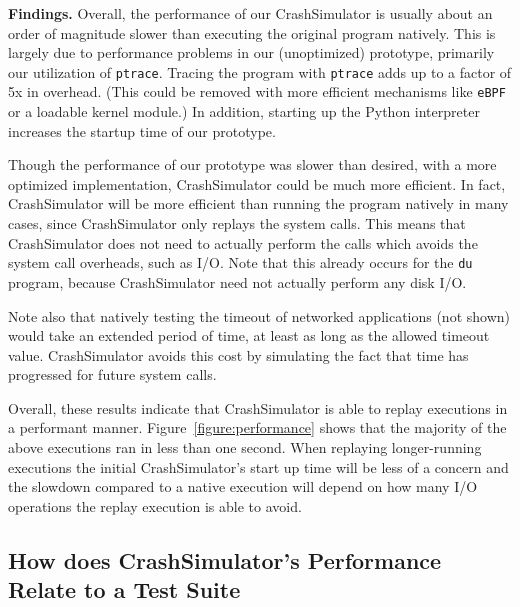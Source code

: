 {\bf Findings.}
Overall, the performance of our CrashSimulator is usually about an order of
magnitude slower than executing the original program natively.  This is 
largely due to performance problems in our (unoptimized) prototype, 
primarily our utilization of {\tt ptrace}.  Tracing the program
with {\tt ptrace} adds up to a factor of 5x in overhead.  (This could
be removed with more efficient mechanisms like {\tt eBPF} or a loadable 
kernel module.)  In addition, starting up the Python interpreter increases the
startup time of our prototype.

Though the performance of our prototype was slower than desired,
with a more optimized implementation, CrashSimulator could be much more 
efficient.
In fact, CrashSimulator will be more efficient than 
running the program natively in many cases, since CrashSimulator only
replays the system calls. This means that CrashSimulator does not need to
actually perform the calls which avoids the system call overheads, such as 
I/O.  Note that this already occurs for the {\tt du} program, because 
CrashSimulator need not actually perform any disk I/O.

Note also that natively testing the timeout of networked applications (not
shown) would take an extended period of time, at least as long as the allowed
timeout value.  CrashSimulator avoids this cost by simulating the fact that
time has progressed for future system calls.

Overall, these results indicate that CrashSimulator is able to replay executions
in a performant manner.  Figure~\ref{figure:performance} shows that the majority
of the above executions ran in less than
one second.  When replaying longer-running executions the initial
CrashSimulator's start up time will be less of a concern and the slowdown
compared to a native execution will depend on how many I/O operations the replay
execution is able to avoid. 

\subsection{How does CrashSimulator's Performance Relate to a Test Suite}
\label{sec-perf-unit-comparison}



